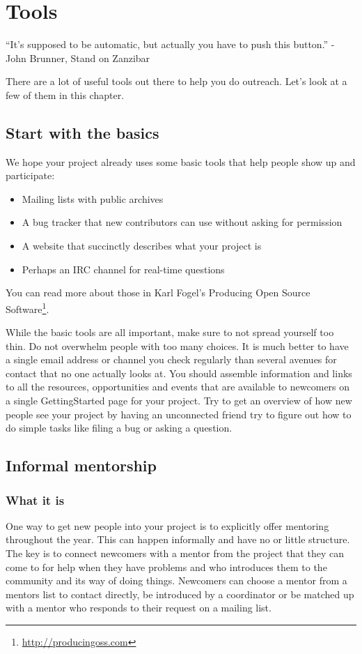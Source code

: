 \chapter{Tools}
“It's supposed to be automatic, but actually you have to push this button.” - John Brunner, Stand on Zanzibar

There are a lot of useful tools out there to help you do outreach. Let’s look at a few of them in this chapter. 

\section{Start with the basics}
We hope your project already uses some basic tools that help people show up and participate:
\begin{itemize}
 \item Mailing lists with public archives
 \item A bug tracker that new contributors can use without asking for permission
 \item A website that succinctly describes what your project is
 \item Perhaps an IRC channel for real-time questions
\end{itemize}

You can read more about those in Karl Fogel’s Producing Open Source Software\footnote{\url{http://producingoss.com}}.

While the basic tools are all important, make sure to not spread yourself too thin. Do not overwhelm people with too many choices. It is much better to have a single email address or channel you check regularly than several avenues for contact that no one actually looks at. You should assemble information and links to all the resources, opportunities and events that are available to newcomers on a single GettingStarted page for your project. Try to get an overview of how new people see your project by having an unconnected friend try to figure out how to do simple tasks like filing a bug or asking a question.

\section{Informal mentorship}
\subsection{What it is}
One way to get new people into your project is to explicitly offer mentoring throughout the year. This can happen informally and have no or little structure. The key is to connect newcomers with a mentor from the project that they can come to for help when they have problems and who introduces them to the community and its way of doing things. Newcomers can choose a mentor from a mentors list to contact directly, be introduced by a coordinator or be matched up with a mentor who responds to their request on a mailing list.

